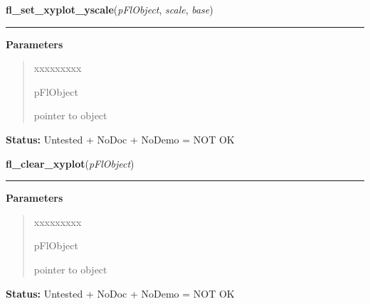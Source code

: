 \hspace{.8\funcindent}\begin{boxedminipage}{\funcwidth}

    \raggedright \textbf{fl\_set\_xyplot\_yscale}(\textit{pFlObject}, \textit{scale}, \textit{base})

    \vspace{-1.5ex}

    \rule{\textwidth}{0.5\fboxrule}
\setlength{\parskip}{2ex}
\setlength{\parskip}{1ex}
      \textbf{Parameters}
      \vspace{-1ex}

      \begin{quote}
        \begin{Ventry}{xxxxxxxxx}

          \item[pFlObject]

          pointer to object

        \end{Ventry}

      \end{quote}

\textbf{Status:} Untested + NoDoc + NoDemo = NOT OK



    \end{boxedminipage}

    \label{xformslib:flxyplot:fl_clear_xyplot}

    \vspace{0.5ex}

\hspace{.8\funcindent}\begin{boxedminipage}{\funcwidth}

    \raggedright \textbf{fl\_clear\_xyplot}(\textit{pFlObject})

    \vspace{-1.5ex}

    \rule{\textwidth}{0.5\fboxrule}
\setlength{\parskip}{2ex}
\setlength{\parskip}{1ex}
      \textbf{Parameters}
      \vspace{-1ex}

      \begin{quote}
        \begin{Ventry}{xxxxxxxxx}

          \item[pFlObject]

          pointer to object

        \end{Ventry}

      \end{quote}

\textbf{Status:} Untested + NoDoc + NoDemo = NOT OK



    \end{boxedminipage}

